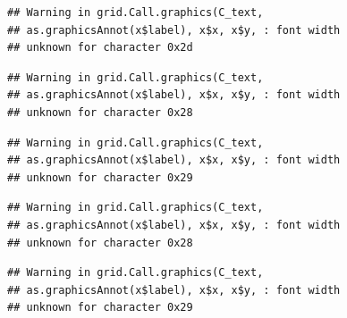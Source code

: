 \documentclass[
]{book}
\begin{document}
\begin{verbatim}
## Warning in grid.Call.graphics(C_text,
## as.graphicsAnnot(x$label), x$x, x$y, : font width
## unknown for character 0x2d
\end{verbatim}

\begin{verbatim}
## Warning in grid.Call.graphics(C_text,
## as.graphicsAnnot(x$label), x$x, x$y, : font width
## unknown for character 0x28
\end{verbatim}

\begin{verbatim}
## Warning in grid.Call.graphics(C_text,
## as.graphicsAnnot(x$label), x$x, x$y, : font width
## unknown for character 0x29
\end{verbatim}

\begin{verbatim}
## Warning in grid.Call.graphics(C_text,
## as.graphicsAnnot(x$label), x$x, x$y, : font width
## unknown for character 0x28
\end{verbatim}

\begin{verbatim}
## Warning in grid.Call.graphics(C_text,
## as.graphicsAnnot(x$label), x$x, x$y, : font width
## unknown for character 0x29
\end{verbatim}
\end{document}
